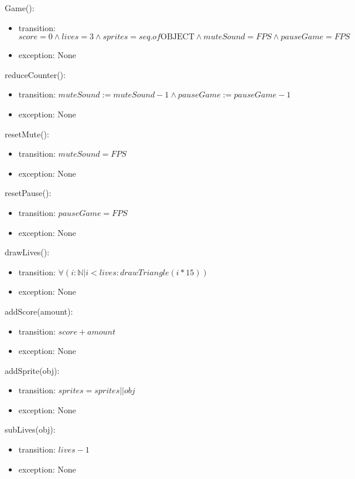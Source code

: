 \documentclass[12pt]{article}
\begin{document}
Game():
\begin{itemize}
    \item transition: $score = 0 \land lives = 3 \land sprites = seq. of \mbox{OBJECT} \land muteSound = FPS \land pauseGame = FPS$
    \item exception: None
\end{itemize}

reduceCounter():
\begin{itemize}
    \item transition: $ muteSound := muteSound - 1 \land pauseGame := pauseGame - 1 $
    \item exception: None
\end{itemize}

resetMute():
\begin{itemize}
    \item transition: $ muteSound = FPS $
    \item exception: None
\end{itemize}

resetPause():
\begin{itemize}
    \item transition: $ pauseGame = FPS $
    \item exception: None
\end{itemize}

drawLives():
\begin{itemize}
    \item transition: $ \forall (i:\mathbb{N} | i < lives : drawTriangle(i*15)) $
    \item exception: None
\end{itemize}

addScore(amount):
\begin{itemize}
    \item transition: $ score + amount $
    \item exception: None
\end{itemize}

addSprite(obj):
\begin{itemize}
    \item transition: $ sprites = sprites || obj $
    \item exception: None
\end{itemize}

subLives(obj):
\begin{itemize}
    \item transition: $ lives - 1 $
    \item exception: None
\end{itemize}
\end{document}
